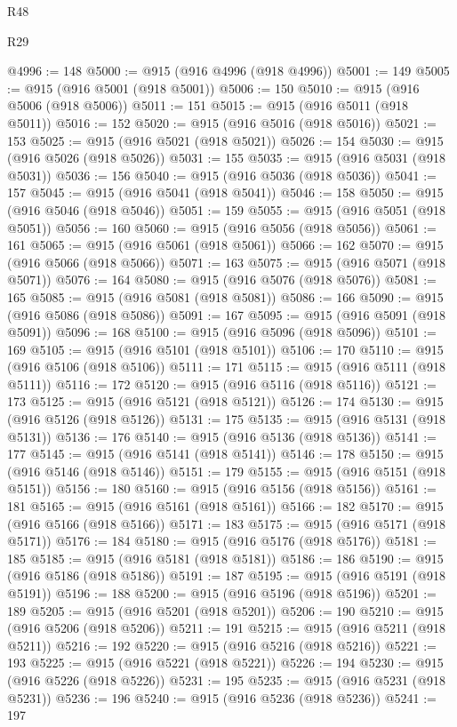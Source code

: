 \begin{lexlean}{R48}
\begin{lexlean}{R29}
\begin{coremodule}
{{{{{{{{{{{{{{{{{{{{{{{{{{{{{{{{{{{{{{{{{{{{{{{{{{{{{{{{{{{{{{{{{{{{{{{{{{{{{{{{{{{{{{{{{{{{{{{{{{{{{{{{{{{{{{{{{{{{{{{{{{{{{{{{{{{{{{{{{{{{{{{{{{{{{{{{{{{{{{{{{{{{{{{{{{{{{{{{{{{{{{{{{{{{{{{{{{{{{{{{{{{{{{{{{{{{{{{{{{@4996 := 148
@5000 := @915 (@916 @4996 (@918 @4996))
@5001 := 149
@5005 := @915 (@916 @5001 (@918 @5001))
@5006 := 150
@5010 := @915 (@916 @5006 (@918 @5006))
@5011 := 151
@5015 := @915 (@916 @5011 (@918 @5011))
@5016 := 152
@5020 := @915 (@916 @5016 (@918 @5016))
@5021 := 153
@5025 := @915 (@916 @5021 (@918 @5021))
@5026 := 154
@5030 := @915 (@916 @5026 (@918 @5026))
@5031 := 155
@5035 := @915 (@916 @5031 (@918 @5031))
@5036 := 156
@5040 := @915 (@916 @5036 (@918 @5036))
@5041 := 157
@5045 := @915 (@916 @5041 (@918 @5041))
@5046 := 158
@5050 := @915 (@916 @5046 (@918 @5046))
@5051 := 159
@5055 := @915 (@916 @5051 (@918 @5051))
@5056 := 160
@5060 := @915 (@916 @5056 (@918 @5056))
@5061 := 161
@5065 := @915 (@916 @5061 (@918 @5061))
@5066 := 162
@5070 := @915 (@916 @5066 (@918 @5066))
@5071 := 163
@5075 := @915 (@916 @5071 (@918 @5071))
@5076 := 164
@5080 := @915 (@916 @5076 (@918 @5076))
@5081 := 165
@5085 := @915 (@916 @5081 (@918 @5081))
@5086 := 166
@5090 := @915 (@916 @5086 (@918 @5086))
@5091 := 167
@5095 := @915 (@916 @5091 (@918 @5091))
@5096 := 168
@5100 := @915 (@916 @5096 (@918 @5096))
@5101 := 169
@5105 := @915 (@916 @5101 (@918 @5101))
@5106 := 170
@5110 := @915 (@916 @5106 (@918 @5106))
@5111 := 171
@5115 := @915 (@916 @5111 (@918 @5111))
@5116 := 172
@5120 := @915 (@916 @5116 (@918 @5116))
@5121 := 173
@5125 := @915 (@916 @5121 (@918 @5121))
@5126 := 174
@5130 := @915 (@916 @5126 (@918 @5126))
@5131 := 175
@5135 := @915 (@916 @5131 (@918 @5131))
@5136 := 176
@5140 := @915 (@916 @5136 (@918 @5136))
@5141 := 177
@5145 := @915 (@916 @5141 (@918 @5141))
@5146 := 178
@5150 := @915 (@916 @5146 (@918 @5146))
@5151 := 179
@5155 := @915 (@916 @5151 (@918 @5151))
@5156 := 180
@5160 := @915 (@916 @5156 (@918 @5156))
@5161 := 181
@5165 := @915 (@916 @5161 (@918 @5161))
@5166 := 182
@5170 := @915 (@916 @5166 (@918 @5166))
@5171 := 183
@5175 := @915 (@916 @5171 (@918 @5171))
@5176 := 184
@5180 := @915 (@916 @5176 (@918 @5176))
@5181 := 185
@5185 := @915 (@916 @5181 (@918 @5181))
@5186 := 186
@5190 := @915 (@916 @5186 (@918 @5186))
@5191 := 187
@5195 := @915 (@916 @5191 (@918 @5191))
@5196 := 188
@5200 := @915 (@916 @5196 (@918 @5196))
@5201 := 189
@5205 := @915 (@916 @5201 (@918 @5201))
@5206 := 190
@5210 := @915 (@916 @5206 (@918 @5206))
@5211 := 191
@5215 := @915 (@916 @5211 (@918 @5211))
@5216 := 192
@5220 := @915 (@916 @5216 (@918 @5216))
@5221 := 193
@5225 := @915 (@916 @5221 (@918 @5221))
@5226 := 194
@5230 := @915 (@916 @5226 (@918 @5226))
@5231 := 195
@5235 := @915 (@916 @5231 (@918 @5231))
@5236 := 196
@5240 := @915 (@916 @5236 (@918 @5236))
@5241 := 197
}}}}}}}}}}}}}}}}}}}}}}}}}}}}}}}}}}}}}}}}}}}}}}}}}}}}}}}}}}}}}}}}}}}}}}}}}}}}}}}}}}}}}}}}}}}}}}}}}}}}}}}}}}}}}}}}}}}}}}}}}}}}}}}}}}}}}}}}}}}}}}}}}}}}}}}}}}}}}}}}}}}}}}}}}}}}}}}}}}}}}}}}}}}}}}}}}}}}}}}}}}}}}}}}}}}}}}}}}}
\end{coremodule}
\end{lexlean}
\end{lexlean}
